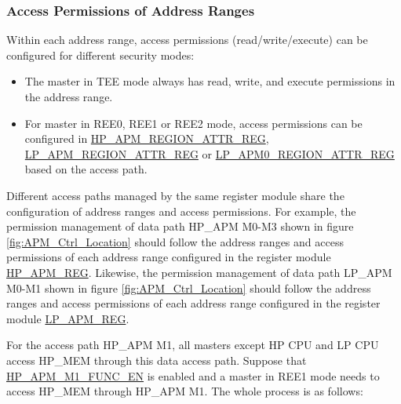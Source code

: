 \documentclass[main\_\_EN.tex]{subfiles}
\begin{document}
\subsubsection{Access Permissions of Address Ranges}

Within each address range, access permissions (read/write/execute) can be configured for different security modes:

\begin{itemize}

    \item The master in TEE mode always has read, write, and execute permissions in the address range.

    \item For master in REE0, REE1 or REE2 mode, access permissions can be configured in \hyperref[regdesc:HPAPMREGION0ATTRREG]{HP\_APM\_REGION\_ATTR\_REG}, \hyperref[regdesc:LPAPMREGION0ATTRREG]{LP\_APM\_REGION\_ATTR\_REG} or \hyperref[regdesc:LPAPM0REGION0ATTRREG]{LP\_APM0\_REGION\_ATTR\_REG} based on the access path. 

\end{itemize}

Different access paths managed by the same register module share the configuration of address ranges and access permissions. For example, the permission management of data path HP\_APM M0-M3 shown in figure \ref{fig:APM_Ctrl_Location} should follow the address ranges and access permissions of each address range configured in the register module \hyperref[sec:permctrl-reg-hp]{HP\_APM\_REG}. Likewise, the permission management of data path LP\_APM M0-M1 shown in figure \ref{fig:APM_Ctrl_Location} should follow the address ranges and access permissions of each address range configured in the register module \hyperref[sec:permctrl-reg-lp]{LP\_APM\_REG}.

For the access path HP\_APM M1, all masters except HP CPU and LP CPU access HP\_MEM through this data access path. Suppose that \hyperref[fielddesc:HPAPMM1FUNCEN]{HP\_APM\_M1\_FUNC\_EN} is enabled and a master in REE1 mode needs to access HP\_MEM through HP\_APM M1. The whole process is as follows:
\end{document}
